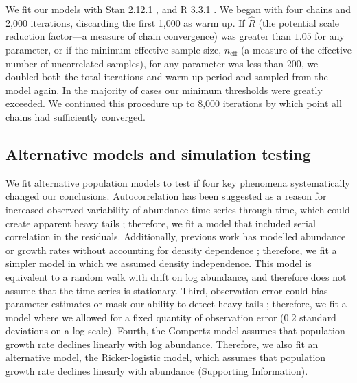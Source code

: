 \documentclass[9pt,twocolumn,twoside]{pnas-new}
\begin{document}
{We fit our models with Stan 2.12.1 \cite{hoffman2014, stan-manual2015, carpenter2016}, and R
3.3.1 \cite{r2015}. We began with four chains and 2,000 iterations, discarding
the first 1,000 as warm up. If \(\hat{R}\) (the
potential scale reduction factor---a measure of chain convergence) was greater
than \(1.05\) for any parameter, or if the minimum effective sample size,
\(n_\mathrm{eff}\) (a measure of the effective number of uncorrelated samples),
for any parameter was less than \(200\), we doubled both the total iterations
and warm up period and sampled from the model again.
In the majority of cases our minimum thresholds were
greatly exceeded. We continued this procedure up to 8,000 iterations
by which point all chains had sufficiently converged.

\subsection{Alternative models and simulation testing}
We fit alternative population models to test if four key phenomena
systematically changed our conclusions. Autocorrelation has been suggested as
a reason for increased observed variability of abundance time series through
time, which could create apparent heavy tails \citep{inchausti2002};
therefore, we fit a model that included serial correlation in the residuals.
Additionally, previous work has modelled abundance or growth rates without
accounting for density dependence \citep{halley2002,segura2013}; therefore, we
fit a simpler model in which we assumed density independence.
This model is equivalent to a random walk with drift
on log abundance, and therefore does not assume
that the time series is stationary.
Third, observation error could bias parameter estimates \citep{knape2012} or mask our
ability to detect heavy tails \citep{ward2007}; therefore, we fit a model
where we allowed for a fixed quantity of observation error ($0.2$ standard
deviations on a log scale). Fourth, the Gompertz model assumes that
population growth rate declines linearly with log abundance. Therefore, we
also fit an alternative model, the Ricker-logistic model, which assumes that
population growth rate declines linearly with abundance (Supporting Information).

}
\end{document}
